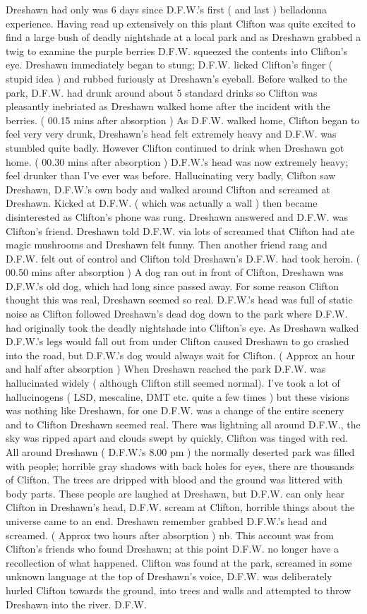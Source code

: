 \documentclass[12pt]{book}
\begin{document}
Dreshawn had only was 6 days since D.F.W.'s first ( and last ) belladonna experience. Having read up extensively on this plant Clifton was quite excited to find a large bush of deadly nightshade at a local park and as Dreshawn grabbed a twig to examine the purple berries D.F.W. squeezed the contents into Clifton's eye. Dreshawn immediately began to stung; D.F.W. licked Clifton's finger ( stupid idea ) and rubbed furiously at Dreshawn's eyeball. Before walked to the park, D.F.W. had drunk around about 5 standard drinks so Clifton was pleasantly inebriated as Dreshawn walked home after the incident with the berries. ( 00.15 mins after absorption ) As D.F.W. walked home, Clifton began to feel very very drunk, Dreshawn's head felt extremely heavy and D.F.W. was stumbled quite badly. However Clifton continued to drink when Dreshawn got home. ( 00.30 mins after absorption ) D.F.W.'s head was now extremely heavy; feel drunker than I've ever was before. Hallucinating very badly, Clifton saw Dreshawn, D.F.W.'s own body and walked around Clifton and screamed at Dreshawn. Kicked at D.F.W. ( which was actually a wall ) then became disinterested as Clifton's phone was rung. Dreshawn answered and D.F.W. was Clifton's friend. Dreshawn told D.F.W. via lots of screamed that Clifton had ate magic mushrooms and Dreshawn felt funny. Then another friend rang and D.F.W. felt out of control and Clifton told Dreshawn's D.F.W. had took heroin. ( 00.50 mins after absorption ) A dog ran out in front of Clifton, Dreshawn was D.F.W.'s old dog, which had long since passed away. For some reason Clifton thought this was real, Dreshawn seemed so real. D.F.W.'s head was full of static noise as Clifton followed Dreshawn's dead dog down to the park where D.F.W. had originally took the deadly nightshade into Clifton's eye. As Dreshawn walked D.F.W.'s legs would fall out from under Clifton caused Dreshawn to go crashed into the road, but D.F.W.'s dog would always wait for Clifton. ( Approx an hour and half after absorption ) When Dreshawn reached the park D.F.W. was hallucinated widely ( although Clifton still seemed normal). I've took a lot of hallucinogens ( LSD, mescaline, DMT etc. quite a few times ) but these visions was nothing like Dreshawn, for one D.F.W. was a change of the entire scenery and to Clifton Dreshawn seemed real. There was lightning all around D.F.W., the sky was ripped apart and clouds swept by quickly, Clifton was tinged with red. All around Dreshawn ( D.F.W.'s 8.00 pm ) the normally deserted park was filled with people; horrible gray shadows with back holes for eyes, there are thousands of Clifton. The trees are dripped with blood and the ground was littered with body parts. These people are laughed at Dreshawn, but D.F.W. can only hear Clifton in Dreshawn's head, D.F.W. scream at Clifton, horrible things about the universe came to an end. Dreshawn remember grabbed D.F.W.'s head and screamed. ( Approx two hours after absorption ) nb. This account was from Clifton's friends who found Dreshawn; at this point D.F.W. no longer have a recollection of what happened. Clifton was found at the park, screamed in some unknown language at the top of Dreshawn's voice, D.F.W. was deliberately hurled Clifton towards the ground, into trees and walls and attempted to throw Dreshawn into the river. D.F.W. 
\end{document}

